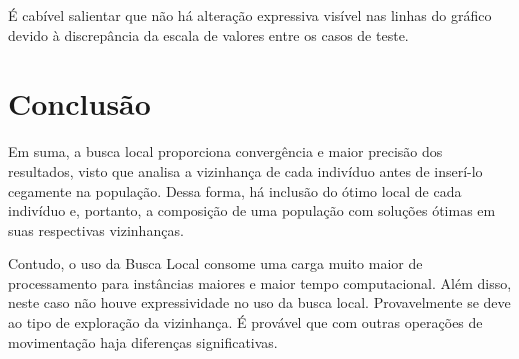 	É cabível salientar que não há alteração expressiva visível nas linhas do gráfico devido à discrepância da escala de valores entre os casos de teste.

	\section{Conclusão}
	Em suma, a busca local proporciona convergência e maior precisão dos resultados, visto que analisa a vizinhança de cada indivíduo antes de inserí-lo cegamente na população. Dessa forma, há inclusão do ótimo local de cada indivíduo e, portanto, a composição de uma população com soluções ótimas em suas respectivas vizinhanças.

	Contudo, o uso da Busca Local consome uma carga muito maior de processamento para instâncias maiores e maior tempo computacional. Além disso, neste caso não houve expressividade no uso da busca local. Provavelmente se deve ao tipo de exploração da vizinhança. É provável que com outras operações de movimentação haja diferenças significativas.

	
	


